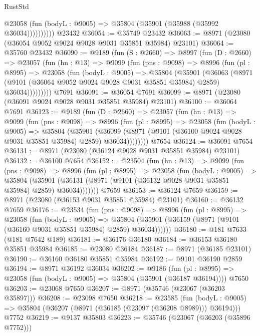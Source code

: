 \begin{lexlean}{RustStd}
\begin{coremodule}
              @23058 (fun (bodyL : @9005) => @35804 (@35901 (@35988 (@35992 @36034))))))))))
    @23432
@36054 := @35749 @23432
@36063 := @8971 (@23080 (@36054 @9052 @9024 @9028 @9031 @35851 @35984) @23101)
@36064 := @35760 @23432
@36090 := @9189
    (fun (S : @2660) =>
    @8997
      (fun (D : @2660) =>
      @23057
        (fun (hn : @13) =>
        @9099
          (fun (pns : @9098) =>
          @8996
            (fun (pl : @8995) =>
            @23058
              (fun (bodyL : @9005) =>
              @35804
                (@35901
                  (@36063
                    (@8971
                      (@9101 (@36064 @9052 @9024 @9028 @9031 @35851 @35984) @2859)
                      @36034)))))))))
    @7691
@36091 := @36054 @7691
@36099 := @8971 (@23080 (@36091 @9024 @9028 @9031 @35851 @35984) @23101)
@36100 := @36064 @7691
@36123 := @9189
    (fun (D : @2660) =>
    @23057
      (fun (hn : @13) =>
      @9099
        (fun (pns : @9098) =>
        @8996
          (fun (pl : @8995) =>
          @23058
            (fun (bodyL : @9005) =>
            @35804
              (@35901
                (@36099 (@8971 (@9101 (@36100 @9024 @9028 @9031 @35851 @35984) @2859) @36034))))))))
    @7654
@36124 := @36091 @7654
@36131 := @8971 (@23080 (@36124 @9028 @9031 @35851 @35984) @23101)
@36132 := @36100 @7654
@36152 := @23504
    (fun (hn : @13) =>
    @9099
      (fun (pns : @9098) =>
      @8996
        (fun (pl : @8995) =>
        @23058
          (fun (bodyL : @9005) =>
          @35804
            (@35901 (@36131 (@8971 (@9101 (@36132 @9028 @9031 @35851 @35984) @2859) @36034)))))))
    @7659
@36153 := @36124 @7659
@36159 := @8971 (@23080 (@36153 @9031 @35851 @35984) @23101)
@36160 := @36132 @7659
@36176 := @23534
    (fun (pns : @9098) =>
    @8996
      (fun (pl : @8995) =>
      @23058
        (fun (bodyL : @9005) =>
        @35804 (@35901 (@36159 (@8971 (@9101 (@36160 @9031 @35851 @35984) @2859) @36034))))))
@36180 := @181 @7633 (@181 @7642 @189)
@36181 := @36176 @36180
@36184 := @36153 @36180 @35851 @35984
@36185 := @23080 @36184
@36187 := @8971 (@36185 @23101)
@36190 := @36160 @36180 @35851 @35984
@36192 := @9101 @36190 @2859
@36194 := @8971 @36192 @36034
@36202 := @9186
    (fun (pl : @8995) => @23058 (fun (bodyL : @9005) => @35804 (@35901 (@36187 @36194))))
    @7650
@36203 := @23068 @7650
@36207 := @8971 (@35746 (@23067 (@36203 @35897)))
@36208 := @23098 @7650
@36218 := @23585
    (fun (bodyL : @9005) => @35804 (@36207 (@8971 (@36185 (@23097 (@36208 @8989))) @36194)))
    @7752
@36219 := @9137 @35803
@36223 := @35746 (@23067 (@36203 (@35896 @7752)))

\end{coremodule}
\end{lexlean}

